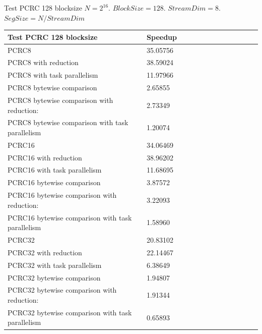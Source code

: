 \documentclass[10pt]{beamer}
\begin{document}
\begin{frame}[fragile]{Test PCRC 128 blocksize}
$N=2^{16}$. $BlockSize=128$. $StreamDim=8$. $SegSize=N/StreamDim$
\begin{footnotesize}
\begin{tabular}{l|l|l|l|l|r|r|r|r|r|r||c|c|}
\toprule
\textbf{Test PCRC 128 blocksize} & \textbf{Speedup} \\
\midrule
PCRC8                                           &	35.05756 \\
PCRC8 with reduction                            &	38.59024 \\
PCRC8 with task parallelism                     &	11.97966 \\
PCRC8 bytewise comparison                       &	2.65855  \\
PCRC8 bytewise comparison with reduction:       &	2.73349  \\
PCRC8 bytewise comparison with task parallelism &	1.20074  \\
PCRC16                                           &	34.06469 \\
PCRC16 with reduction                            &	38.96202 \\
PCRC16 with task parallelism                     &	11.68695 \\
PCRC16 bytewise comparison                       &	3.87572  \\
PCRC16 bytewise comparison with reduction:       &	3.22093  \\
PCRC16 bytewise comparison with task parallelism &	1.58960  \\
PCRC32                                           &	20.83102 \\
PCRC32 with reduction                            &	22.14467 \\
PCRC32 with task parallelism                     &	6.38649  \\
PCRC32 bytewise comparison                       &	1.94807  \\
PCRC32 bytewise comparison with reduction:       &	1.91344  \\
PCRC32 bytewise comparison with task parallelism &	0.65893  \\
\bottomrule
\end{tabular}
\end{footnotesize}
\end{frame}
\end{document}
